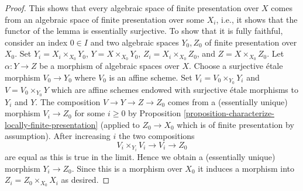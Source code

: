 \documentclass{stacks-project}
\theoremstyle{plain}
\theoremstyle{definition}
\theoremstyle{remark}
\numberwithin{equation}{subsection}
\begin{document}
\begin{proof}
\medskip\noindent
This shows that every algebraic space of finite presentation over $X$ comes
from an algebraic space of finite presentation over some $X_i$, i.e.,
it shows that the functor of the lemma is essentially surjective. To
show that it is fully faithful, consider an index $0 \in I$ and two
algebraic spaces $Y_0, Z_0$ of finite presentation over $X_0$.
Set $Y_i = X_i \times_{X_0} Y_0$, $Y = X \times_{X_0} Y_0$,
$Z_i = X_i \times_{X_0} Z_0$, and $Z = X \times_{X_0} Z_0$. Let
$\alpha : Y \to Z$ be a morphism of algebraic spaces over $X$.
Choose a surjective \'etale morphism $V_0 \to Y_0$ where $V_0$ is
an affine scheme. Set $V_i = V_0 \times_{Y_0} Y_i$ and
$V = V_0 \times_{Y_0} Y$ which are affine schemes endowed with
surjective \'etale morphisms to $Y_i$ and $Y$. The composition
$V \to Y \to Z \to Z_0$ comes from a (essentially unique) morphism
$V_i \to Z_0$ for some $i \geq 0$ by
Proposition \ref{proposition-characterize-locally-finite-presentation}
(applied to $Z_0 \to X_0$ which is of finite presentation by assumption).
After increasing $i$ the two compositions
$$
V_i \times_{Y_i} V_i \to V_i \to Z_0
$$
are equal as this is true in the limit. Hence we obtain a (essentially unique)
morphism $Y_i \to Z_0$. Since this is a morphism over $X_0$
it induces a morphism into $Z_i = Z_0 \times_{X_0} X_i$ as desired.
\end{proof}
\end{document}
